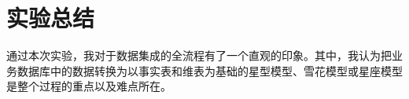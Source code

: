 \section{实验总结}
通过本次实验，我对于数据集成的全流程有了一个直观的印象。其中，我认为把业务数据库中的数据转换为以事实表和维表为基础的星型模型、雪花模型或星座模型
是整个过程的重点以及难点所在。